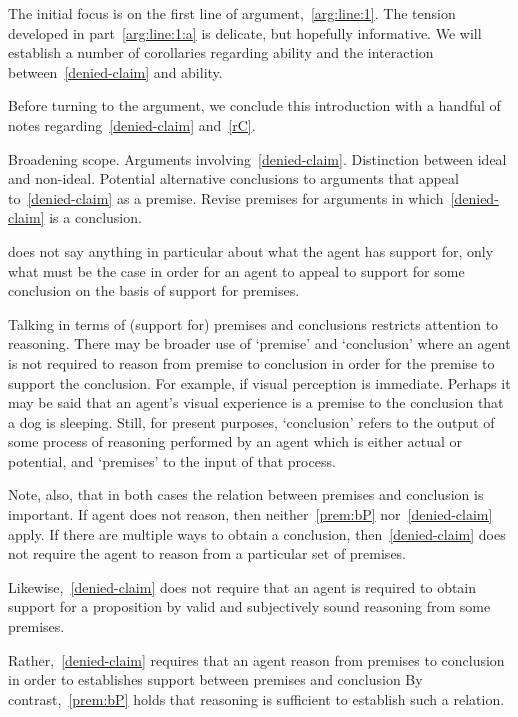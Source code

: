 \begin{note}
  The initial focus is on the first line of argument,~\ref{arg:line:1}.
  The tension developed in part~\ref{arg:line:1:a} is delicate, but hopefully informative.
  We will establish a number of corollaries regarding ability and the interaction between~\ref{denied-claim} and ability.
\end{note}

\begin{note}
  Before turning to the argument, we conclude this introduction with a handful of notes regarding~\ref{denied-claim} and~\ref{rC}.
\end{note}

\begin{note}


  Broadening scope.
  Arguments involving~\ref{denied-claim}.
  Distinction between ideal and non-ideal.
  Potential alternative conclusions to arguments that appeal to~\ref{denied-claim} as a premise.
  Revise premises for arguments in which~\ref{denied-claim} is a conclusion.
\end{note}

\begin{note}[Scope of \mp{}]
  \mp{} does not say anything in particular about what the agent has support for, only what must be the case in order for an agent to appeal to support for some conclusion on the basis of support for premises.

  Talking in terms of (support for) premises and conclusions restricts attention to reasoning.
  There may be broader use of `premise' and `conclusion' where an agent is not required to reason from premise to conclusion in order for the premise to support the conclusion.
  For example, if visual perception is immediate.
  Perhaps it may be said that an agent's visual experience is a premise to the conclusion that a dog is sleeping.
  Still, for present purposes, `conclusion' refers to the output of some process of reasoning performed by an agent which is either actual or potential, and `premises' to the input of that process.

  Note, also, that in both cases the relation between premises and conclusion is important.
  If agent does not reason, then neither~\ref{prem:bP} nor~\ref{denied-claim} apply.
  If there are multiple ways to obtain a conclusion, then~\ref{denied-claim} does not require the agent to reason from a particular set of premises.

  Likewise,~\ref{denied-claim} does not require that an agent is required to obtain support for a proposition by valid and subjectively sound reasoning from some premises.

  Rather,~\ref{denied-claim} requires that an agent reason from premises to conclusion in order to establishes support between premises and conclusion
  By contrast,~\ref{prem:bP} holds that reasoning is sufficient to establish such a relation.
\end{note}


